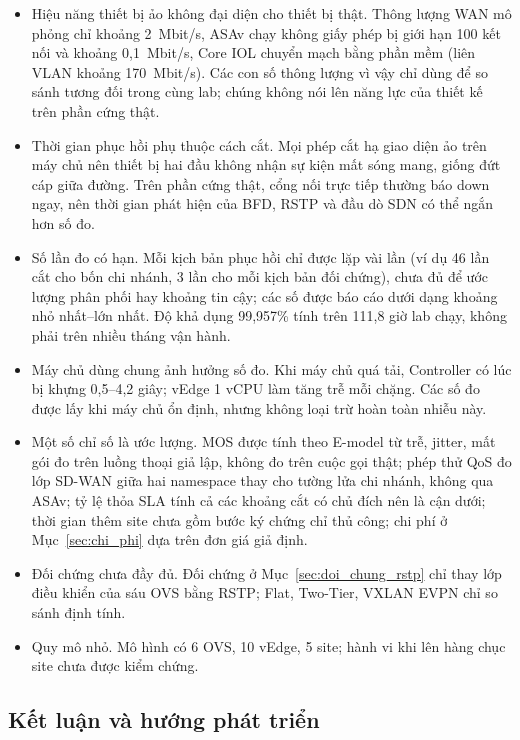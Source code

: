 \begin{itemize}
    \item Hiệu năng thiết bị ảo không đại diện cho thiết bị thật. Thông lượng WAN mô phỏng chỉ khoảng 2~Mbit/s, ASAv chạy không giấy phép bị giới hạn 100 kết nối và khoảng 0,1~Mbit/s, Core IOL chuyển mạch bằng phần mềm (liên VLAN khoảng 170~Mbit/s). Các con số thông lượng vì vậy chỉ dùng để so sánh tương đối trong cùng lab; chúng không nói lên năng lực của thiết kế trên phần cứng thật.
    \item Thời gian phục hồi phụ thuộc cách cắt. Mọi phép cắt hạ giao diện ảo trên máy chủ nên thiết bị hai đầu không nhận sự kiện mất sóng mang, giống đứt cáp giữa đường. Trên phần cứng thật, cổng nối trực tiếp thường báo down ngay, nên thời gian phát hiện của BFD, RSTP và đầu dò SDN có thể ngắn hơn số đo.
    \item Số lần đo có hạn. Mỗi kịch bản phục hồi chỉ được lặp vài lần (ví dụ 46 lần cắt cho bốn chi nhánh, 3 lần cho mỗi kịch bản đối chứng), chưa đủ để ước lượng phân phối hay khoảng tin cậy; các số được báo cáo dưới dạng khoảng nhỏ nhất--lớn nhất. Độ khả dụng 99,957\% tính trên 111,8 giờ lab chạy, không phải trên nhiều tháng vận hành.
    \item Máy chủ dùng chung ảnh hưởng số đo. Khi máy chủ quá tải, Controller có lúc bị khựng 0,5--4,2 giây; vEdge 1 vCPU làm tăng trễ mỗi chặng. Các số đo được lấy khi máy chủ ổn định, nhưng không loại trừ hoàn toàn nhiễu này.
    \item Một số chỉ số là ước lượng. MOS được tính theo E-model từ trễ, jitter, mất gói đo trên luồng thoại giả lập, không đo trên cuộc gọi thật; phép thử QoS đo lớp SD-WAN giữa hai namespace thay cho tường lửa chi nhánh, không qua ASAv; tỷ lệ thỏa SLA tính cả các khoảng cắt có chủ đích nên là cận dưới; thời gian thêm site chưa gồm bước ký chứng chỉ thủ công; chi phí ở Mục~\ref{sec:chi_phi} dựa trên đơn giá giả định.
    \item Đối chứng chưa đầy đủ. Đối chứng ở Mục~\ref{sec:doi_chung_rstp} chỉ thay lớp điều khiển của sáu OVS bằng RSTP; Flat, Two-Tier, VXLAN EVPN chỉ so sánh định tính.
    \item Quy mô nhỏ. Mô hình có 6 OVS, 10 vEdge, 5 site; hành vi khi lên hàng chục site chưa được kiểm chứng.
\end{itemize}

\subsection{Kết luận và hướng phát triển}\label{sec:ket_luan_huong_phat_trien}

